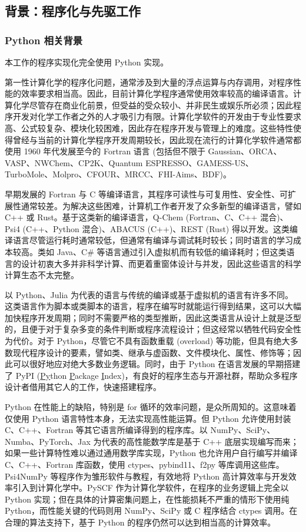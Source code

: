 \subsection{背景：程序化与先驱工作}
\label{sec.3.background}

\subsubsection{Python 相关背景}

本工作的程序实现化完全使用 Python 实现。

第一性计算化学的程序化问题，通常涉及到大量的浮点运算与内存调用，对程序性能的效率要求相当高。因此，目前计算化学程序通常使用效率较高的编译语言。计算化学尽管存在商业化前景，但受益的受众较小、并非民生或娱乐所必须；因此程序开发对化学工作者之外的人才吸引力有限。计算化学软件的开发由于专业性要求高、公式较复杂、模块化较困难，因此存在程序开发与管理上的难度。这些特性使得曾经与当前的计算化学程序开发周期较长，因此现在流行的计算化学软件通常都使用 1960 年代发展至今的 Fortran 语言 (包括但不限于 Gaussian、ORCA、VASP、NWChem、CP2K、Quantum ESPRESSO、GAMESS-US、TurboMole、Molpro、CFOUR、MRCC、FHI-Aims、BDF)。

早期发展的 Fortran 与 C 等编译语言，其程序可读性与可复用性、安全性、可扩展性通常较差。为解决这些困难，计算机工作者开发了众多新型的编译语言，譬如 C++ 或 Rust。基于这类新的编译语言，Q-Chem (Fortran、C、C++ 混合)、Psi4 (C++、Python 混合)、ABACUS (C++)、REST (Rust) 得以开发。这类编译语言尽管运行耗时通常较低，但通常有编译与调试耗时较长；同时语言的学习成本较高。类如 Java、C\# 等语言通过引入虚拟机而有较低的编译耗时；但这类语言的设计初衷大多并非科学计算、而更着重窗体设计与并发，因此这些语言的科学计算生态不太完整。

以 Python、Julia 为代表的语言与传统的编译或基于虚拟机的语言有许多不同。这类语言作为脚本或类脚本的语言，程序在编写时就能运行得到结果，这可以大幅加快程序开发周期；同时不需要严格的类型推断，因此这类语言从设计上就是泛型的，且便于对于复杂多变的条件判断或程序流程设计；但这经常以牺牲代码安全性为代价。对于 Python，尽管它不具有函数重载 (overload) 等功能，但具有绝大多数现代程序设计的要素，譬如类、继承与虚函数、文件模块化、属性、修饰等；因此可以很好地应对绝大多数业务逻辑。同时，由于 Python 在语言发展的早期搭建了 PyPI (\underline{Py}thon \underline{P}ackage \underline{I}ndex)，有良好的程序生态与开源社群，帮助众多程序设计者借用其它人的工作，快速搭建程序。

Python 在性能上的缺陷，特别是 for 循环的效率问题，是众所周知的。这意味着仅使用 Python 语言特性本身，无法实现高性能运算。但 Python 允许使用封装 C、C++、Fortran 等其它语言所编译得到的程序库。以 NumPy、SciPy、Numba、PyTorch、Jax 为代表的高性能数学库是基于 C++ 底层实现编写而来；如果一些计算特性难以通过通用数学库实现，Python 也允许用户自行编写并编译 C、C++、Fortran 库函数，使用 ctypes、pybind11、f2py 等库调用这些库。Psi4NumPy 等程序作为雏形软件与教程，有效地将 Python 高计算效率与开发效率引入到计算化学中。PySCF 作为计算化学软件，在程序的业务逻辑上完全以 Python 实现；但在具体的计算密集问题上，在性能损耗不严重的情形下使用纯 Python，而性能关键的代码则用 NumPy、SciPy 或 C 程序结合 ctypes 调用。在合理的算法支持下，基于 Python 的程序仍然可以达到相当高的计算效率。

